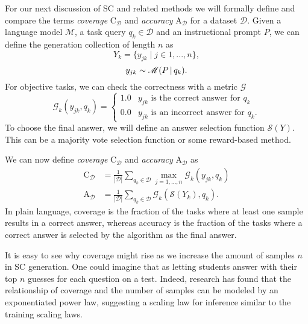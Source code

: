 For our next discussion of SC and related methods we will formally define and compare the terms \textit{coverage} $\mathrm{C}_{\mathcal{D}}$ and \textit{accuracy} $\mathrm{A}_{\mathcal{D}}$ for a dataset ${\mathcal{D}}$.
Given a language model $\mathscr{M}$, a task query $q_k \in {\mathcal{D}}$ and an instructional prompt $P$, we can define the generation collection of length $n$ as
\begin{equation}
    Y_k = \{y_{jk}\mid j \in 1, ..., n\},
\end{equation}
\begin{equation}
    y_{jk} \sim \mathscr{M}(P \, \vert \, q_k).
\end{equation}
For objective tasks, we can check the correctness with a metric $\mathcal{G}$
\begin{equation}
    \mathcal{G}_{k}(y_{jk}, q_k) = 
    \begin{cases}
        1.0 & y_{jk} \text{ is the correct answer for } q_k\\
        0.0 & y_{jk} \text{ is an incorrect answer for } q_k.
    \end{cases}
\end{equation}
To choose the final answer, we will define an answer selection function $\mathcal{S}(Y)$. 
This can be a majority vote selection function or some reward-based method.

We can now define \textit{coverage} $\mathrm{C}_{\mathcal{D}}$ and \textit{accuracy} $\mathrm{A}_{\mathcal{D}}$ as
\begin{align}
    \mathrm{C}_{\mathcal{D}} &= \frac{1}{|\mathcal{D}|} \sum_{q_k \in \mathcal{D}} \max_{j=1,...,n} \mathcal{G}_k(y_{jk}, q_k) \\
    \mathrm{A}_{\mathcal{D}} &= \frac{1}{|\mathcal{D}|} \sum_{q_k \in \mathcal{D}} \mathcal{G}_k\left( \mathcal{S}(Y_k), q_k \right).
\end{align}
In plain language, coverage is the fraction of the tasks where at least one sample results in a correct answer,
whereas accuracy is the fraction of the tasks where a correct answer is selected by the algorithm as the final answer.

It is easy to see why coverage might rise as we increase the amount of samples $n$ in SC generation.
One could imagine that as letting students answer with their top $n$ guesses for each question on a test. 
Indeed, research\cite{brown2024largelanguagemonkeysscaling} has found that the relationship of coverage and the 
number of samples can be modeled by an exponentiated power law, suggesting a scaling law for inference
similar to the training scaling laws\cite{kaplan2020scalinglawsneurallanguage}.

